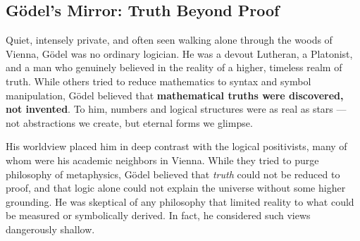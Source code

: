 \subsection{Gödel’s Mirror: Truth Beyond Proof}

Quiet, intensely private, and often seen walking alone through the woods of Vienna, Gödel was no ordinary logician. He was a devout Lutheran, a Platonist, and a man who genuinely believed in the reality of a higher, timeless realm of truth. While others tried to reduce mathematics to syntax and symbol manipulation, Gödel believed that \textbf{mathematical truths were discovered, not invented}. To him, numbers and logical structures were as real as stars — not abstractions we create, but eternal forms we glimpse.

His worldview placed him in deep contrast with the logical positivists, many of whom were his academic neighbors in Vienna. While they tried to purge philosophy of metaphysics, Gödel believed that \textit{truth} could not be reduced to proof, and that logic alone could not explain the universe without some higher grounding. He was skeptical of any philosophy that limited reality to what could be measured or symbolically derived. In fact, he considered such views dangerously shallow.



